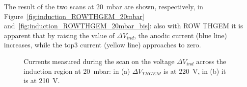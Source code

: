 \documentclass[a4paper, 11 pt]{article}
\newcommand{\Vind}{$\Delta V_{ind}$}
\newcommand{\Vthgem}{$\Delta V_{THGEM}$}
\begin{document}
The result of the two scans at 20~mbar are shown, respectively, in Figure~\ref{fig:induction_ROWTHGEM_20mbar} and~\ref{fig:induction_ROWTHGEM_20mbar_bis}: also with ROW THGEM it is apparent that by raising the value of \Vind{}, the anodic current (blue line) increases, while the top3 current (yellow line) approaches to zero.
\begin{figure}[!htb]
	\centering
	\caption{Currents measured during the scan on the voltage \Vind{} across the induction region at 20~mbar: in (a) \Vthgem{} is at 220~V, in (b) it is at 210~V.}
	\label{fig:induction_ROWTHGEM_20mbar_both}
\end{figure}
\end{document}
